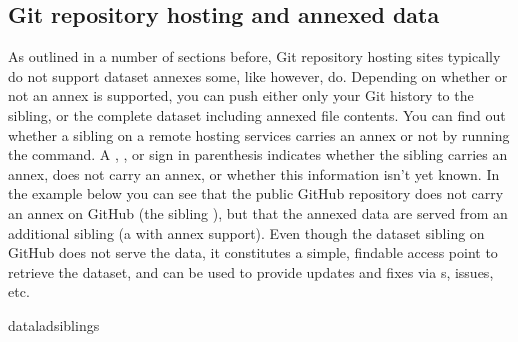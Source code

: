 \subsection{Git repository hosting and annexed data}
\label{\detokenize{basics/101-139-hostingservices:git-repository-hosting-and-annexed-data}}
\sphinxAtStartPar
As outlined in a number of sections before, Git repository hosting sites typically do not support dataset annexes \sphinxhyphen{} some, like {\hyperref[\detokenize{glossary:term-GIN}]{}} however, do.
Depending on whether or not an annex is supported, you can push either only your Git history to the sibling, or the complete dataset including annexed file contents.
You can find out whether a sibling on a remote hosting services carries an annex or not by running the  command.
A \sphinxcode{\sphinxupquote{+}}, \sphinxcode{\sphinxupquote{\sphinxhyphen{}}}, or  sign in parenthesis indicates whether the sibling carries an annex, does not carry an annex, or whether this information isn’t yet known.
In the example below you can see that the public GitHub repository  does not carry an annex on GitHub (the sibling ), but that the annexed data are served from an additional sibling  (a {\hyperref[\detokenize{glossary:term-special-remote}]{}} with annex support).
Even though the dataset sibling on GitHub does not serve the data, it constitutes a simple, findable access point to retrieve the dataset, and can be used to provide updates and fixes via {\hyperref[\detokenize{glossary:term-pull-request}]{}}s, issues, etc.

\begin{sphinxVerbatim}[commandchars=\\\{\}]
dataladsiblings
\end{sphinxVerbatim}

